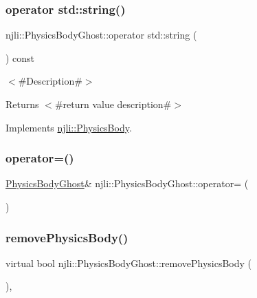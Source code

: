 \subsubsection{\texorpdfstring{operator std\+::string()}{operator std::string()}}
{\footnotesize\ttfamily njli\+::\+Physics\+Body\+Ghost\+::operator std\+::string (\begin{DoxyParamCaption}{ }\end{DoxyParamCaption}) const\hspace{0.3cm}{\ttfamily [virtual]}}

$<$\#\+Description\#$>$

\begin{DoxyReturn}{Returns}
$<$\#return value description\#$>$ 
\end{DoxyReturn}


Implements \mbox{\hyperlink{classnjli_1_1_physics_body_a0c12067445dfd7893e37052ae90a9173}{njli\+::\+Physics\+Body}}.

\mbox{\label{classnjli_1_1_physics_body_ghost_a40aa22c5e94ed4d58315d538bad51732}} 
\subsubsection{\texorpdfstring{operator=()}{operator=()}}
{\footnotesize\ttfamily \mbox{\hyperlink{classnjli_1_1_physics_body_ghost}{Physics\+Body\+Ghost}}\& njli\+::\+Physics\+Body\+Ghost\+::operator= (\begin{DoxyParamCaption}\item[{const \mbox{\hyperlink{classnjli_1_1_physics_body_ghost}{Physics\+Body\+Ghost}} \&}]{ }\end{DoxyParamCaption})\hspace{0.3cm}{\ttfamily [protected]}}

\mbox{\label{classnjli_1_1_physics_body_ghost_a854f866870a887026cfb87d441008595}} 
\subsubsection{\texorpdfstring{remove\+Physics\+Body()}{removePhysicsBody()}}
{\footnotesize\ttfamily virtual bool njli\+::\+Physics\+Body\+Ghost\+::remove\+Physics\+Body (\begin{DoxyParamCaption}{ }\end{DoxyParamCaption})\hspace{0.3cm}{\ttfamily [protected]}, {\ttfamily [virtual]}}



